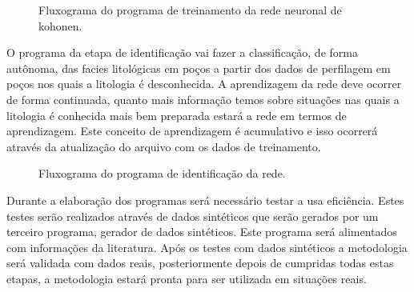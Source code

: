 \begin{figure}[H]
	\centering
	\caption{Fluxograma do programa de treinamento da rede neuronal de kohonen.}
\end{figure}

O programa da etapa de identificação vai fazer a classificação, de forma autônoma, das facies litológicas em poços a partir dos dados de perfilagem em poços nos quais a litologia é desconhecida. A aprendizagem da rede deve ocorrer de forma continuada, quanto mais informação temos sobre situações nas quais a litologia é conhecida mais bem preparada estará a rede em termos de aprendizagem. Este conceito de aprendizagem é acumulativo e isso ocorrerá através da atualização do arquivo com os dados de treinamento.

\begin{figure}[H]
	\centering
	\caption{Fluxograma do programa de identificação da rede.}
\end{figure}

Durante a elaboração dos programas será necessário testar a usa eficiência. Estes testes serão realizados através de dados sintéticos que serão gerados por um terceiro programa, gerador de dados sintéticos. Este programa será alimentados com informações da literatura. Após os testes com dados sintéticos a metodologia será validada com dados reais, posteriormente depois de cumpridas todas estas etapas, a metodologia estará pronta para ser utilizada em situações reais.

